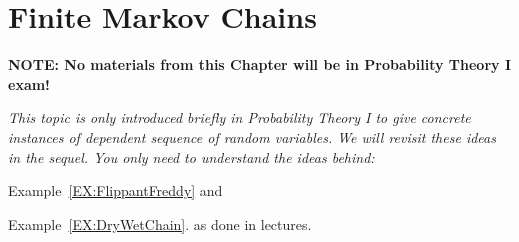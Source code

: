 \chapter{Finite Markov Chains}\label{C:FiniteMarkovChains}

{\bf NOTE: No materials from this Chapter will be in Probability Theory I exam!}\\[6pt]

{\em This topic is only introduced briefly in Probability Theory I to give concrete instances of dependent sequence of random variables. 
We will revisit these ideas in the sequel. You only need to understand the ideas behind:
\bit
\item Example~\ref{EX:FlippantFreddy} and 
\item Example~\ref{EX:DryWetChain}.
\eit
as done in lectures.}




